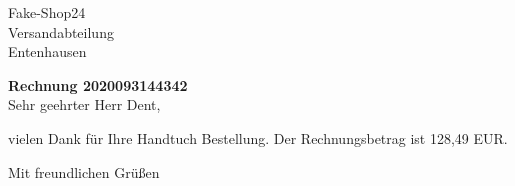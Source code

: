 \documentclass[german,a4,12pt]{scrlttr2}
\begin{document}
\begin{letter}{Fake-Shop24\\ Versandabteilung\\ Entenhausen}

\opening{\textbf{Rechnung 2020093144342}\\[1cm] Sehr geehrter Herr Dent,}


vielen Dank für Ihre Handtuch Bestellung. Der Rechnungsbetrag ist 128,49 EUR.

\closing{Mit freundlichen Grüßen}

\end{letter}
\end{document}
